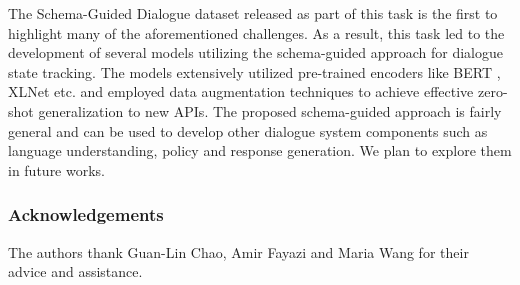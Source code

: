 The Schema-Guided Dialogue dataset released as part of this task is the first to highlight many of the aforementioned challenges. As a result, this task led to the development of several models utilizing the schema-guided approach for dialogue state tracking. The models extensively utilized pre-trained encoders like BERT \cite{devlin2019bert}, XLNet \cite{yang2019xlnet} etc. and employed data augmentation techniques to achieve effective zero-shot generalization to new APIs. The proposed schema-guided approach is fairly general and can be used to develop other dialogue system components such as language understanding, policy and response generation. We plan to explore them in future works.

\subsubsection{Acknowledgements} The authors thank Guan-Lin Chao, Amir Fayazi and Maria Wang for their advice and assistance.

\fontsize{9.0pt}{10.0pt} \selectfont


